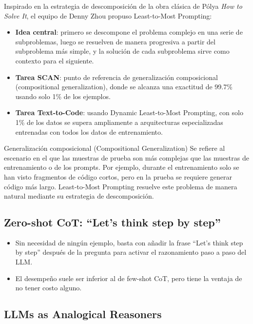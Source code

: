 \documentclass[a4paper]{article}
\begin{document}
Inspirado en la estrategia de descomposición de la obra clásica de P\'{o}lya \textit{How to Solve It}, el equipo de Denny Zhou propuso Least-to-Most Prompting:

\begin{itemize}
    \item \textbf{Idea central}: primero se descompone el problema complejo en una serie de subproblemas, luego se resuelven de manera progresiva a partir del subproblema más simple, y la solución de cada subproblema sirve como contexto para el siguiente.
    \item \textbf{Tarea SCAN}: punto de referencia de generalización composicional (compositional generalization), donde se alcanza una exactitud de 99.7\% usando solo 1\% de los ejemplos.
    \item \textbf{Tarea Text-to-Code}: usando Dynamic Least-to-Most Prompting, con solo 1\% de los datos se supera ampliamente a arquitecturas especializadas entrenadas con todos los datos de entrenamiento.
\end{itemize}

\begin{knowledgebox}{Generalización composicional (Compositional Generalization)}
Se refiere al escenario en el que las muestras de prueba son más complejas que las muestras de entrenamiento o de los prompts. Por ejemplo, durante el entrenamiento solo se han visto fragmentos de código cortos, pero en la prueba se requiere generar código más largo. Least-to-Most Prompting resuelve este problema de manera natural mediante su estrategia de descomposición.
\end{knowledgebox}

\subsection{Zero-shot CoT: ``Let's think step by step''}

\begin{itemize}
    \item Sin necesidad de ningún ejemplo, basta con añadir la frase ``Let's think step by step'' después de la pregunta para activar el razonamiento paso a paso del LLM.
    \item El desempeño suele ser inferior al de few-shot CoT, pero tiene la ventaja de no tener costo alguno.
\end{itemize}

\subsection{LLMs as Analogical Reasoners}
\end{document}
